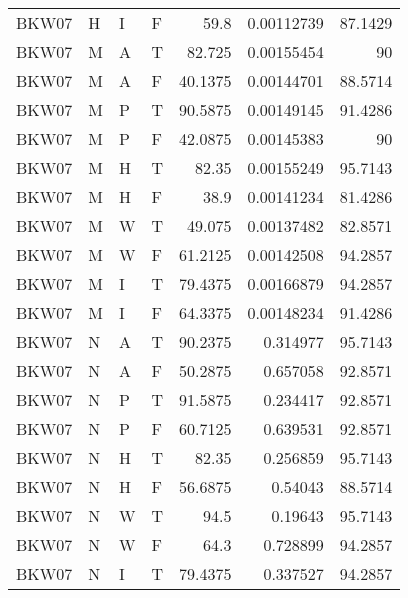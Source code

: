 \begin{longtable}{llllrrr}
    BKW07    & H         & I         & F          & 59.8       & 0.00112739  & 87.1429  \\
    BKW07    & M         & A         & T          & 82.725     & 0.00155454  & 90       \\
    BKW07    & M         & A         & F          & 40.1375    & 0.00144701  & 88.5714  \\
    BKW07    & M         & P         & T          & 90.5875    & 0.00149145  & 91.4286  \\
    BKW07    & M         & P         & F          & 42.0875    & 0.00145383  & 90       \\
    BKW07    & M         & H         & T          & 82.35      & 0.00155249  & 95.7143  \\
    BKW07    & M         & H         & F          & 38.9       & 0.00141234  & 81.4286  \\
    BKW07    & M         & W         & T          & 49.075     & 0.00137482  & 82.8571  \\
    BKW07    & M         & W         & F          & 61.2125    & 0.00142508  & 94.2857  \\
    BKW07    & M         & I         & T          & 79.4375    & 0.00166879  & 94.2857  \\
    BKW07    & M         & I         & F          & 64.3375    & 0.00148234  & 91.4286  \\
    BKW07    & N         & A         & T          & 90.2375    & 0.314977    & 95.7143  \\
    BKW07    & N         & A         & F          & 50.2875    & 0.657058    & 92.8571  \\
    BKW07    & N         & P         & T          & 91.5875    & 0.234417    & 92.8571  \\
    BKW07    & N         & P         & F          & 60.7125    & 0.639531    & 92.8571  \\
    BKW07    & N         & H         & T          & 82.35      & 0.256859    & 95.7143  \\
    BKW07    & N         & H         & F          & 56.6875    & 0.54043     & 88.5714  \\
    BKW07    & N         & W         & T          & 94.5       & 0.19643     & 95.7143  \\
    BKW07    & N         & W         & F          & 64.3       & 0.728899    & 94.2857  \\
    BKW07    & N         & I         & T          & 79.4375    & 0.337527    & 94.2857  \\

\end{longtable}
